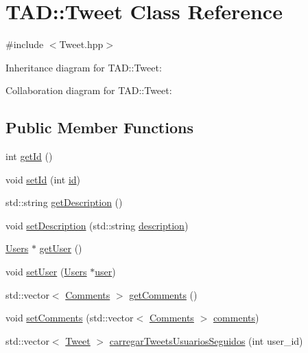 \hypertarget{class_t_a_d_1_1_tweet}{}\section{T\+AD\+:\+:Tweet Class Reference}
\label{class_t_a_d_1_1_tweet}


{\ttfamily \#include $<$Tweet.\+hpp$>$}



Inheritance diagram for T\+AD\+:\+:Tweet\+:


Collaboration diagram for T\+AD\+:\+:Tweet\+:
\subsection*{Public Member Functions}
\begin{DoxyCompactItemize}
\item 
int \hyperlink{class_t_a_d_1_1_tweet_a276cb63fb55db4baca5dc67896e22064}{get\+Id} ()
\item 
void \hyperlink{class_t_a_d_1_1_tweet_a97b90ec1437cb5d449ab6fa29b81b64c}{set\+Id} (int \hyperlink{class_t_a_d_1_1_tweet_a0d651a6534a245a02596f66e799e1d25}{id})
\item 
std\+::string \hyperlink{class_t_a_d_1_1_tweet_a5c7d069967139e2d37667b0f36d87fdc}{get\+Description} ()
\item 
void \hyperlink{class_t_a_d_1_1_tweet_a1a999b2e287aed6d0f516861c99552e4}{set\+Description} (std\+::string \hyperlink{class_t_a_d_1_1_tweet_a54d7321d45fc3aa94e09b45f255d5e39}{description})
\item 
\hyperlink{class_t_a_d_1_1_users}{Users} $\ast$ \hyperlink{class_t_a_d_1_1_tweet_a7559dba5f9e88d030920698e7f353ca7}{get\+User} ()
\item 
void \hyperlink{class_t_a_d_1_1_tweet_ae7cf435af414cdae915f9644a199ed4f}{set\+User} (\hyperlink{class_t_a_d_1_1_users}{Users} $\ast$\hyperlink{class_t_a_d_1_1_tweet_a6dd31e59ddf90b5fe0083f1dbf14104b}{user})
\item 
std\+::vector$<$ \hyperlink{class_t_a_d_1_1_comments}{Comments} $>$ \hyperlink{class_t_a_d_1_1_tweet_a20ab9183171e77face3cdd0bfd1e1197}{get\+Comments} ()
\item 
void \hyperlink{class_t_a_d_1_1_tweet_ac38fbf3aa171c60d535282ee1ec3d132}{set\+Comments} (std\+::vector$<$ \hyperlink{class_t_a_d_1_1_comments}{Comments} $>$ \hyperlink{class_t_a_d_1_1_tweet_a79850077946ffb68a228244aeeb8a3ca}{comments})
\item 
std\+::vector$<$ \hyperlink{class_t_a_d_1_1_tweet}{Tweet} $>$ \hyperlink{class_t_a_d_1_1_tweet_a2004ca4ef3d3954806af8a088803c1ba}{carregar\+Tweets\+Usuarios\+Seguidos} (int user\+\_\+id)

\end{DoxyCompactItemize}
